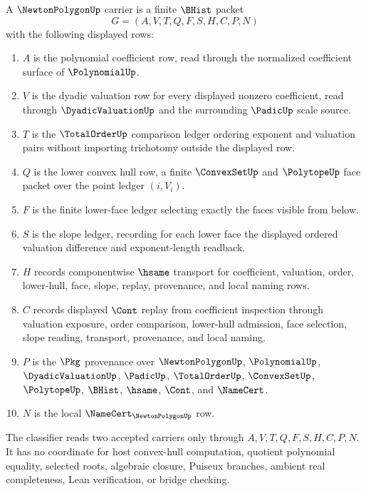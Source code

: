 \begin{definition}
\label{def:newton-polygon-carrier}
A $\NewtonPolygonUp$ carrier is a finite $\BHist$ packet
$$
G=(A,V,T,Q,F,S,H,C,P,N)
$$
with the following displayed rows:
\begin{enumerate}
\item $A$ is the polynomial coefficient row, read through the normalized coefficient surface of $\PolynomialUp$.
\item $V$ is the dyadic valuation row for every displayed nonzero coefficient, read through $\DyadicValuationUp$ and the surrounding $\PadicUp$ scale source.
\item $T$ is the $\TotalOrderUp$ comparison ledger ordering exponent and valuation pairs without importing trichotomy outside the displayed row.
\item $Q$ is the lower convex hull row, a finite $\ConvexSetUp$ and $\PolytopeUp$ face packet over the point ledger $(i,V_i)$.
\item $F$ is the finite lower-face ledger selecting exactly the faces visible from below.
\item $S$ is the slope ledger, recording for each lower face the displayed ordered valuation difference and exponent-length readback.
\item $H$ records componentwise $\hsame$ transport for coefficient, valuation, order, lower-hull, face, slope, replay, provenance, and local naming rows.
\item $C$ records displayed $\Cont$ replay from coefficient inspection through valuation exposure, order comparison, lower-hull admission, face selection, slope reading, transport, provenance, and local naming.
\item $P$ is the $\Pkg$ provenance over $\NewtonPolygonUp$, $\PolynomialUp$, $\DyadicValuationUp$, $\PadicUp$, $\TotalOrderUp$, $\ConvexSetUp$, $\PolytopeUp$, $\BHist$, $\hsame$, $\Cont$, and $\NameCert$.
\item $N$ is the local $\NameCert_{\NewtonPolygonUp}$ row.
\end{enumerate}
The classifier reads two accepted carriers only through $A,V,T,Q,F,S,H,C,P,N$. It has no coordinate for host convex-hull computation, quotient polynomial equality, selected roots, algebraic closure, Puiseux branches, ambient real completeness, Lean verification, or bridge checking.
\end{definition}

